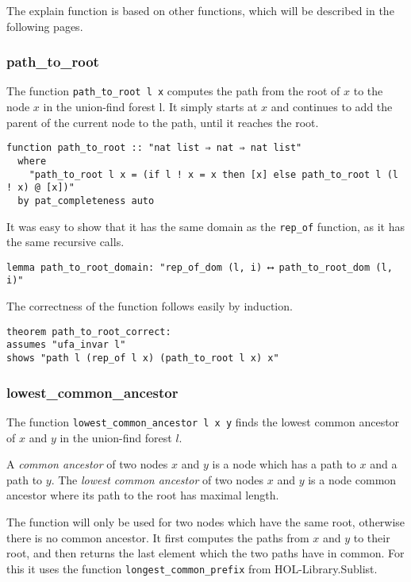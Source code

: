 The explain function is based on other functions, which will be described in the following pages.

\subsubsection{path\_to\_root}

The function \lstinline{path_to_root l x} computes the path from the root of $x$ to the node $x$ in the union-find forest l. It simply starts at $x$ and continues to add the parent of the current node to the path, until it reaches the root.

\begin{lstlisting}
function path_to_root :: "nat list ⇒ nat ⇒ nat list"
  where
    "path_to_root l x = (if l ! x = x then [x] else path_to_root l (l ! x) @ [x])"
  by pat_completeness auto
\end{lstlisting}

It was easy to show that it has the same domain as the \lstinline{rep_of} function, as it has the same recursive calls.

\begin{lstlisting}
lemma path_to_root_domain: "rep_of_dom (l, i) ⟷ path_to_root_dom (l, i)"
\end{lstlisting}

The correctness of the function follows easily by induction.

\begin{lstlisting}
theorem path_to_root_correct:
assumes "ufa_invar l"
shows "path l (rep_of l x) (path_to_root l x) x"
\end{lstlisting}

\subsubsection{lowest\_common\_ancestor}

The function \lstinline{lowest_common_ancestor l x y} finds the lowest common ancestor of $x$ and $y$ in the union-find forest $l$.

\begin{definition}
	A \emph{common ancestor} of two nodes $x$ and $y$ is a node which has a path to $x$ and a path to $y$.
	The \emph{lowest common ancestor} of two nodes $x$ and $y$ is a node common ancestor where its path to the root has maximal length.
\end{definition}

The function will only be used for two nodes which have the same root, otherwise there is no common ancestor. It first computes the paths from $x$ and $y$ to their root, and then returns the last element which the two paths have in common. For this it uses the function \lstinline{longest_common_prefix} from HOL-Library.Sublist\cite{Sublist}.

